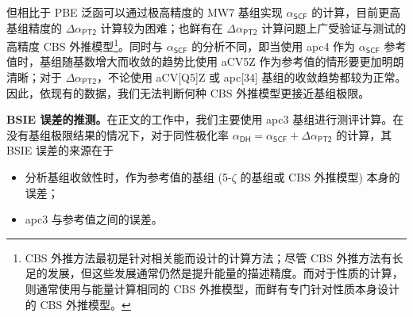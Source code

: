 但相比于 PBE 泛函可以通过极高精度的 MW7 基组实现 $\alpha_\textsf{SCF}$ 的计算，目前更高基组精度的 $\Delta \alpha_\textsf{PT2}$ 计算较为困难；也鲜有在 $\Delta \alpha_\textsf{PT2}$ 计算问题上广受验证与测试的高精度 CBS 外推模型\footnote{CBS 外推方法最初是针对相关能而设计的计算方法\cite{Nyden-Petersson.JCP.1981}；尽管 CBS 外推方法有长足的发展\cite{Peterson-Dunning.JCP.1994, Nyden-Petersson.JCP.1981, Petersson-Mantzaris.JCP.1988, Jensen-Jensen.TCA.2005, Karton-Martin.TCA.2006, Klopper-Kutzelnigg.JMST.1986, Kutzelnigg-Morgan.JCP.1992, Martin-Martin.CPL.1996, Helgaker-Noga.JCP.1997, Halkier-Wilson.CPL.1998, Halkier-Olsen.CPL.1999}，但这些发展通常仍然是提升能量的描述精度。而对于性质的计算，则通常使用与能量计算相同的 CBS 外推模型\cite{Monten-Deleuze.MP.2011, Huzak-Deleuze.JCP.2013, Hait-Head-Gordon.JCTC.2018, Hait-Head-Gordon.PCCP.2018}，而鲜有专门针对性质本身设计的 CBS 外推模型。}。同时与 $\alpha_\textsf{SCF}$ 的分析不同，即当使用 apc4 作为 $\alpha_\textsf{SCF}$ 参考值时，基组随基数增大而收敛的趋势比使用 aCV5Z 作为参考值的情形要更加明朗清晰；对于 $\Delta \alpha_\textsf{PT2}$，不论使用 aCV[Q5]Z 或 apc[34] 基组的收敛趋势都较为正常。因此，依现有的数据，我们无法判断何种 CBS 外推模型更接近基组极限。

\textbf{BSIE 误差的推测。}在正文的工作中，我们主要使用 apc3 基组进行测评计算。在没有基组极限结果的情况下，对于同性极化率 $\alpha_\textsf{DH} = \alpha_\textsf{SCF} + \Delta \alpha_\textsf{PT2}$ 的计算，其 BSIE 误差的来源在于
\begin{itemize}[nosep]
    \item 分析基组收敛性时，作为参考值的基组 (5-$\zeta$ 的基组或 CBS 外推模型) 本身的误差；
    \item apc3 与参考值之间的误差。
\end{itemize}

